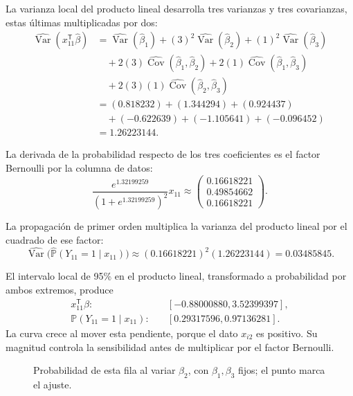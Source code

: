 \documentclass[11pt,a4paper]{article}
\newcommand{\Prob}{\mathbb P}
\newcommand{\T}{^{\mathsf T}}
\DeclareMathOperator{\Var}{Var}
\DeclareMathOperator{\Cov}{Cov}
\begin{document}
La varianza local del producto lineal desarrolla tres varianzas
y tres covarianzas, estas últimas multiplicadas por dos:
\[
\begin{aligned}
\widehat{\Var}(x_{11}\T\widehat\beta)&=\widehat{\Var}(\widehat\beta_1)+(3)^2\widehat{\Var}(\widehat\beta_2)+(1)^2\widehat{\Var}(\widehat\beta_3)\\&\quad+2(3)\widehat{\Cov}(\widehat\beta_1,\widehat\beta_2)+2(1)\widehat{\Cov}(\widehat\beta_1,\widehat\beta_3)\\&\quad+2(3)(1)\widehat{\Cov}(\widehat\beta_2,\widehat\beta_3)\\&=(0.818232)+(1.344294)+(0.924437)\\&\quad+(-0.622639)+(-1.105641)+(-0.096452)\\&=1.26223144.\end{aligned}
\]

La derivada de la probabilidad respecto de los tres coeficientes
es el factor Bernoulli por la columna de datos:
\[
\frac{e^{1.32199259}}{(1+e^{1.32199259})^2}x_{11}\approx\begin{pmatrix}0.16618221\\0.49854662\\0.16618221\end{pmatrix}.
\]

La propagación de primer orden multiplica la varianza del
producto lineal por el cuadrado de ese factor:
\[
\widehat{\Var}\bigl(\widehat{\Prob}(Y_{11}=1\mid x_{11})\bigr)\approx(0.16618221)^2(1.26223144)=0.03485845.
\]

El intervalo local de 95\% en el producto lineal,
transformado a probabilidad por ambos extremos, produce
\[
\begin{aligned}
x_{11}\T\beta:&\quad[-0.88000880,3.52399397],\\\Prob(Y_{11}=1\mid x_{11}):&\quad[0.29317596,0.97136281].\end{aligned}
\]
La curva crece al mover esta pendiente, porque el dato $x_{i2}$ es positivo. Su magnitud controla la sensibilidad antes de multiplicar por el factor Bernoulli.
\begin{figure}[H]\centering
{}
\caption{Probabilidad de esta fila al variar \(\beta_2\), con \(\beta_1,\beta_3\) fijos; el punto marca el ajuste.}
\end{figure}
\end{document}
